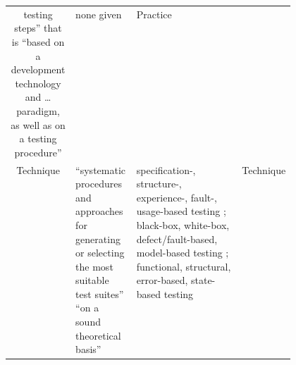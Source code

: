 \begin{table}[hbtp!]
\begin{tabularx}{\linewidth}{|c|X|m{0.37\linewidth}|m{0.1\linewidth}|}
        testing steps'' \cite[p.~2]{BarbosaEtAl2006} that
        is ``based on a development technology and \dots
        paradigm, as well as on a testing procedure''
        \cite[p.~3]{BarbosaEtAl2006}      & none given         & Practice                               \\
        Technique                         & ``systematic
        procedures and approaches for generating or selecting the most suitable test
        suites'' \cite[p.~5-10]{SWEBOK2024} ``on a sound theoretical basis''
        \cite[p.~3]{BarbosaEtAl2006}      & specification-,
        structure-, experience-, fault-, usage-based testing \citep[pp.~5-10, 5-13 to 5-15]{SWEBOK2024};
        black-box, white-box, defect/fault-based, model-based testing \citep[p.~3]{SouzaEtAl2017};
        functional, structural, error-based, state-based testing
        \cite[p.~3]{BarbosaEtAl2006}
                                          & Technique                                                   \\
        \hline
    \end{tabularx}
\end{table}

